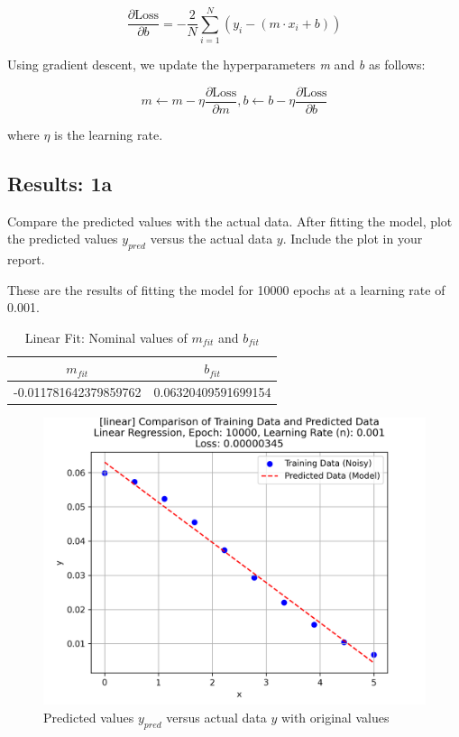 \documentclass[letterpaper, 10 pt, conference]{ieeeconf}  %
\begin{document}
\begin{equation}
   \frac{\partial \text{Loss}}{\partial b}
   =
   -\frac{2}{N}\sum^{N}_{i=1} (y_i - (m \cdot x_i + b) )
\end{equation}

Using gradient descent, we update the hyperparameters \textit{m} and \textit{b} as follows:

\begin{equation}
   m \leftarrow m - \eta \frac{\partial \text{Loss}}{\partial m}, b \leftarrow b - \eta\frac{\partial \text{Loss}}{\partial b}
\end{equation}

where $\eta$ is the learning rate.

\subsection{Results: 1a}
Compare the predicted values with the actual data. 
After fitting the model, plot the predicted values $y_{pred}$ versus the actual data $y$. Include the plot in your report. 

These are the results of fitting the model for 10000 epochs at a learning rate of 0.001.

\begin{table}[h]
   \centering
   \caption{Linear Fit: Nominal values of $m_{fit}$ and $b_{fit}$}
   \label{tab:Lin_Nominal_mb}
   \begin{tabular}{|c|c|}
      \hline
      $m_{fit}$ & $b_{fit}$ \\
      \hline
      -0.011781642379859762 & 0.06320409591699154 \\
      \hline
   \end{tabular}
\end{table}

\begin{figure}[h!]
   \centering
   \includegraphics[width=0.8\linewidth]{../Figures/linear_regression_e_10000_n_0.001.png}
   \caption{Predicted values $y_{pred}$ versus actual data $y$ with original values }
   \label{fig:Lin_a}
\end{figure}
\end{document}
